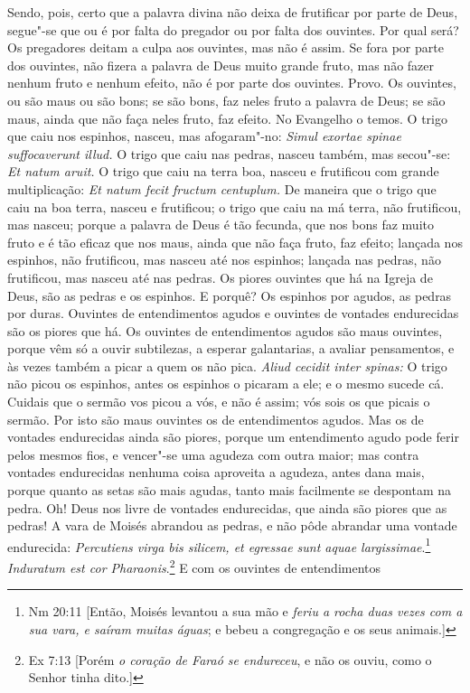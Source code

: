 Sendo, pois, certo que a palavra divina não deixa de frutificar
por parte de Deus, segue"-se que ou é por falta do pregador ou por
falta dos ouvintes. Por qual será? Os pregadores deitam a culpa aos
ouvintes, mas não é assim. Se fora por parte dos ouvintes, não fizera a
palavra de Deus muito grande fruto, mas não fazer nenhum fruto e
nenhum efeito, não é por parte dos ouvintes. Provo. Os ouvintes, ou são
maus ou são bons; se são bons, faz neles fruto a palavra de Deus; se são maus, ainda que não faça neles
fruto, faz efeito. No Evangelho o temos. O trigo que caiu nos espinhos,
nasceu, mas afogaram"-no: \emph{Simul exortae spinae suffocaverunt
illud.} O trigo que caiu nas pedras, nasceu também, mas secou"-se:
\emph{Et natum aruit.} O trigo que caiu na terra boa, nasceu e
frutificou com grande multiplicação: \emph{Et natum fecit fructum centuplum.} De maneira que o trigo que caiu na boa terra, nasceu e
frutificou; o trigo que caiu na má terra, não frutificou, mas nasceu;
porque a palavra de Deus é tão fecunda, que nos bons faz muito fruto e é
tão eficaz que nos maus, ainda que não faça fruto, faz efeito; lançada
nos espinhos, não frutificou, mas nasceu até nos espinhos; lançada nas
pedras, não frutificou, mas nasceu até nas pedras. Os piores ouvintes
que há na Igreja de Deus, são as pedras e os espinhos. E porquê? Os
espinhos por agudos, as pedras por duras. Ouvintes de entendimentos
agudos e ouvintes de vontades endurecidas são os piores que há. Os
ouvintes de entendimentos agudos são maus ouvintes, porque vêm só a
ouvir subtilezas, a esperar galantarias, a avaliar pensamentos, e às
vezes também a picar a quem os não pica. \emph{Aliud cecidit inter
spinas:} O trigo não picou os espinhos, antes os espinhos o picaram a
ele; e o mesmo sucede cá. Cuidais que o sermão vos picou a vós, e não é
assim; vós sois os que picais o sermão. Por isto são maus ouvintes os de
entendimentos agudos. Mas os de vontades endurecidas ainda são piores,
porque um entendimento agudo pode ferir pelos mesmos fios, e vencer"-se
uma agudeza com outra maior; mas contra vontades endurecidas nenhuma
coisa aproveita a agudeza, antes dana mais, porque quanto as setas são
mais agudas, tanto mais facilmente se despontam na pedra. Oh! Deus nos
livre de vontades endurecidas, que ainda são piores que as pedras! A
vara de Moisés abrandou as pedras, e não pôde abrandar uma vontade
endurecida:
\emph{Percutiens virga bis silicem, et egressae sunt aquae
largissimae}.\footnote{Nm 20:11 [Então, Moisés levantou a sua mão e \textit{feriu a rocha duas vezes com a sua vara, e saíram muitas águas}; e bebeu a congregação e os seus animais.]} \emph{Induratum est cor
Pharaonis}.\footnote{Ex 7:13 [Porém \textit{o coração de Faraó se endureceu}, e não os ouviu, como o Senhor tinha dito.]} E com os ouvintes de entendimentos
